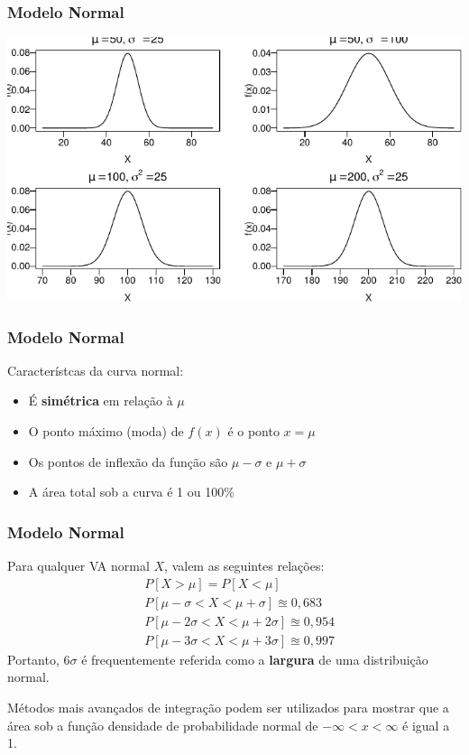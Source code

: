 \documentclass[11pt]{beamer}
\begin{document}
\begin{frame}
\frametitle{Modelo Normal}

\begin{center}\includegraphics[width=0.99\linewidth]{figs/unnamed-chunk_5_1} \end{center}
\end{frame}

\begin{frame}
\frametitle{Modelo Normal}

Característcas da curva normal:

\begin{itemize}
\item
  É \textbf{simétrica} em relação à \(\mu\)
\item
  O ponto máximo (moda) de \(f(x)\) é o ponto \(x=\mu\)
\item
  Os pontos de inflexão da função são \(\mu-\sigma\) e \(\mu+\sigma\)
\item
  A área total sob a curva é 1 ou 100\%
\end{itemize}
\end{frame}

\begin{frame}
\frametitle{Modelo Normal}

Para qualquer VA normal \(X\), valem as seguintes relações:
\begin{align*}
&P[X > \mu] = P[X < \mu] \\
&P[\mu - \sigma < X < \mu + \sigma] \approxeq 0,683 \\
&P[\mu - 2\sigma < X < \mu + 2\sigma] \approxeq 0,954 \\
&P[\mu - 3\sigma < X < \mu + 3\sigma] \approxeq 0,997
\end{align*} Portanto, \(6\sigma\) é frequentemente referida como a
\textbf{largura} de uma distribuição normal.

Métodos mais avançados de integração podem ser utilizados para mostrar
que a área sob a função densidade de probabilidade normal de
\(-\infty < x < \infty\) é igual a 1.
\end{frame}
\end{document}
